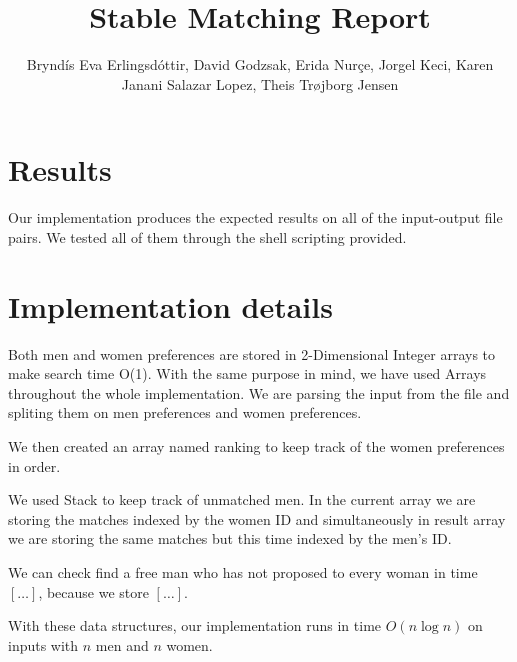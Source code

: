 \documentclass{tufte-handout}
\title{Stable Matching Report}
\author{Bryndís Eva Erlingsdóttir, David Godzsak, Erida Nurçe, Jorgel Keci, Karen Janani Salazar Lopez, Theis Trøjborg Jensen}
\begin{document}
  \maketitle

  \section{Results}

  Our implementation produces the expected results on all of the input-output file pairs. We tested all of them through the shell scripting provided.
    

  \section{Implementation details}
  
   Both men and women preferences are stored in 2-Dimensional Integer arrays to make search time O(1). With the same purpose in mind, we      have used Arrays throughout the whole implementation.
   We are parsing the input from the file and spliting them on men preferences and women preferences.
   
   
   We then created an array named ranking to keep track of the women preferences in order.
   
   We used Stack to keep track of unmatched men.
   In the current array we are storing the matches indexed by the women ID and simultaneously in result array we are storing the same        matches but this time indexed by the men's ID.
   
  We can check find a free man who has not proposed to every woman in time $[\ldots]$,
  because we store $[\ldots]$.

  With these data structures, our implementation runs in time $O(n\log n)$  
  on inputs with $n$ men and $n$ women.
\end{document}
